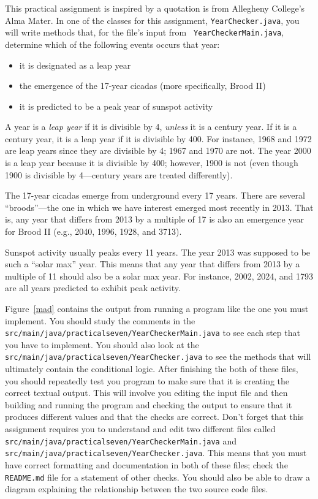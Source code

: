 \documentclass[11pt]{article}
\newcommand{\mainprogramsource}{\lstinline{src/main/java/practicalseven/YearCheckerMain.java}}
\newcommand{\secondprogramsource}{\lstinline{src/main/java/practicalseven/YearChecker.java}}
\begin{document}
This practical assignment is inspired by a quotation is from Allegheny College's
Alma Mater. In one of the classes for this assignment, {\tt YearChecker.java},
you will write methods that, for the file's input from {\tt
YearCheckerMain.java}, determine which of the following events occurs that year:
\begin{itemize}

\item it is designated as a leap year

\item the emergence of the 17-year cicadas (more specifically, Brood II)

\item it is predicted to be a peak year of sunspot activity

\end{itemize}

\noindent A year is a {\em leap year\/} if it is divisible by 4, {\em unless\/}
it is a century year. If it is a century year, it is a leap year if it is
divisible by 400. For instance, 1968 and 1972 are leap years since they are
divisible by 4; 1967 and 1970 are not. The year 2000 is a leap year because it
is divisible by 400; however, 1900 is not (even though 1900 is divisible by
4---century years are treated differently).

\noindent The 17-year cicadas emerge from underground every 17 years. There are
several ``broods''---the one in which we have interest emerged most recently in
2013. That is, any year that differs from 2013 by a multiple of 17 is also an
emergence year for Brood II (e.g., 2040, 1996, 1928, and 3713).

\noindent Sunspot activity usually peaks every 11 years. The year 2013 was
supposed to be such a ``solar max'' year. This means that any year that differs
from 2013 by a multiple of 11 should also be a solar max year. For instance,
2002, 2024, and 1793 are all years predicted to exhibit peak activity.

Figure~\ref{mad} contains the output from running a program like the one you
must implement. You should study the comments in the \mainprogramsource{} to see
each step that you have to implement. You should also look at the
\secondprogramsource{} to see the methods that will ultimately contain the
conditional logic. After finishing the both of these files, you should
repeatedly test you program to make sure that it is creating the correct textual
output. This will involve you editing the input file and then building and
running the program and checking the output to ensure that it produces different
values and that the checks are correct. Don't forget that this assignment
requires you to understand and edit two different files called
\mainprogramsource{} and \secondprogramsource{}. This means that you must have
correct formatting and documentation in both of these files; check the {\tt
README.md} file for a statement of other checks. You should also be able to draw
a diagram explaining the relationship between the two source code files.
\end{document}
